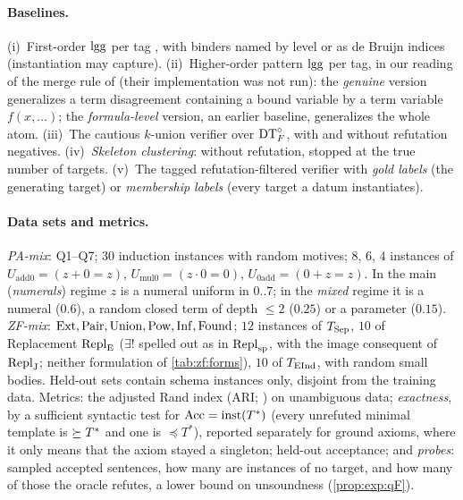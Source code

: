 \paragraph{Baselines.}
(i)~First-order $\mathrm{lgg}$ per tag \citep{plotkin1970note,reynolds1970transformational}, with binders named by level or as de Bruijn indices (instantiation may capture). (ii)~Higher-order pattern $\mathrm{lgg}$ per tag, in our reading of the merge rule of \citet{baumgartner2017higher} (their implementation was not run): the \emph{genuine} version generalizes a term disagreement containing a bound variable by a term variable $f(x,\dots)$; the \emph{formula-level} version, an earlier baseline, generalizes the whole atom. (iii)~The cautious $k$-union verifier over $\mathrm{DT}^{\circ}_{F}$, with and without refutation negatives. (iv)~\emph{Skeleton clustering}: \DTRC{} without refutation, stopped at the true number of targets. (v)~The tagged refutation-filtered verifier with \emph{gold labels} (the generating target) or \emph{membership labels} (every target a datum instantiates).

\paragraph{Data sets and metrics.}
\emph{PA-mix}: Q1--Q7; $30$ induction instances with random motives; $8$, $6$, $4$ instances of $U_{\mathrm{add0}}=(z+0=z)$, $U_{\mathrm{mul0}}=(z\cdot0=0)$, $U_{\mathrm{0add}}=(0+z=z)$. In the main (\emph{numerals}) regime $z$ is a numeral uniform in $0..7$; in the \emph{mixed} regime it is a numeral ($0.6$), a random closed term of depth $\le2$ ($0.25$) or a parameter ($0.15$). \emph{ZF-mix}: $\mathrm{Ext},\mathrm{Pair},\mathrm{Union},\mathrm{Pow},\mathrm{Inf},\mathrm{Found}$; $12$ instances of $T_{\mathrm{Sep}}$, $10$ of Replacement $\mathrm{Repl}_{\mathrm{E}}$ ($\exists!$ spelled out as in $\mathrm{Repl}_{\mathrm{sp}}$, with the image consequent of $\mathrm{Repl}_{\mathrm{J}}$; neither formulation of \cref{tab:zf:forms}), $10$ of $T_{\mathrm{EInd}}$, with random small bodies. Held-out sets contain schema instances only, disjoint from the training data. Metrics: the adjusted Rand index (ARI; \citealp{hubert1985comparing}) on unambiguous data; \emph{exactness}, by a sufficient syntactic test for $\mathrm{Acc}=\mathrm{inst}(T^*)$ (every unrefuted minimal template is $\succeq T^*$ and one is $\preceq T^*$), reported separately for ground axioms, where it only means that the axiom stayed a singleton; held-out acceptance; and \emph{probes}: sampled accepted sentences, how many are instances of no target, and how many of those the oracle refutes, a lower bound on unsoundness (\cref{prop:exp:qF}).

